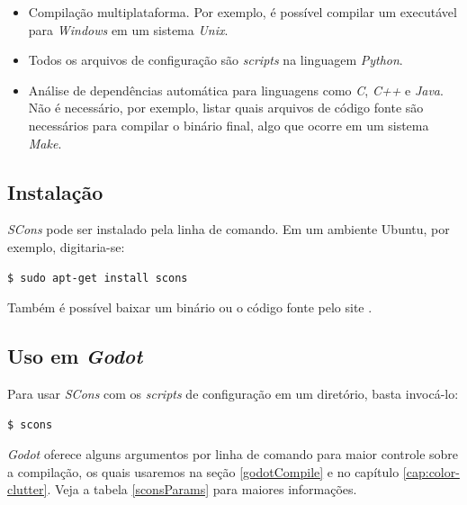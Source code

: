 \begin{itemize}
\item Compilação multiplataforma. Por exemplo, é possível compilar um executável para \textit{Windows} em um sistema \textit{Unix}.

\item Todos os arquivos de configuração são \textit{scripts} na linguagem \textit{Python}.

\item Análise de dependências automática para linguagens como \textit{C}, \textit{C++} e \textit{Java}. Não é necessário, por exemplo, listar quais arquivos de código fonte são necessários para compilar o binário final, algo que ocorre em um sistema \textit{Make}.
\end{itemize}


\subsection{Instalação}

\textit{SCons} pode ser instalado pela linha de comando. Em um ambiente Ubuntu, por exemplo, digitaria-se:

\begin{lstlisting}[language=Bash]
$ sudo apt-get install scons
\end{lstlisting}

Também é possível baixar um binário ou o código fonte pelo site \citep{sconsDownload}.


\subsection{Uso em \textit{Godot}}

Para usar \textit{SCons} com os \textit{scripts} de configuração em um diretório, basta invocá-lo:

\begin{lstlisting}[language=Bash]
$ scons
\end{lstlisting}

\textit{Godot} oferece alguns argumentos por linha de comando para maior controle sobre a compilação, os quais usaremos na seção \ref{godotCompile} e no capítulo \ref{cap:color-clutter}. Veja a tabela \ref{sconsParams} para maiores informações.

